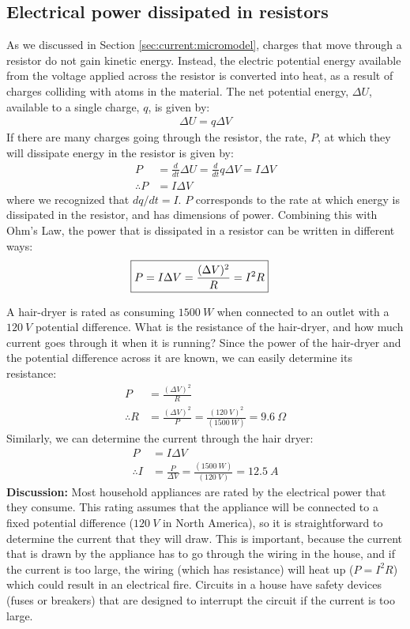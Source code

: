 \subsection{Electrical power dissipated in resistors}
As we discussed in Section \ref{sec:current:micromodel}, charges that move through a resistor do not gain kinetic energy. Instead, the electric potential energy available from the voltage applied across the resistor is converted into heat, as a result of charges colliding with atoms in the material. The net potential energy, $\Delta U$, available to a single charge, $q$, is given by:
\begin{align*}
\Delta U=q\Delta V
\end{align*}
If there are many charges going through the resistor, the rate, $P$, at which they will dissipate energy in the resistor is given by:
\begin{align*}
P&=\frac{d}{dt}\Delta U=\frac{d}{dt}q\Delta V=I\Delta V\\
\therefore P&=I\Delta V
\end{align*}
where we recognized that $dq/dt=I$. $P$ corresponds to the rate at which energy is dissipated in the resistor, and has dimensions of power. Combining this with Ohm's Law, the power that is dissipated in a resistor can be written in different ways:
\begin{align*}
\Aboxed{P=I \Delta V=\frac{(\Delta V)^2}{R}=I^2R}
\end{align*}
\begin{example}{A hair-dryer is rated as consuming $\SI{1500}{W}$ when connected to an outlet with a $\SI{120}{V}$ potential difference. What is the resistance of the hair-dryer, and how much current goes through it when it is running?}
Since the power of the hair-dryer and the potential difference across it are known, we can easily determine its resistance:
\begin{align*}
P&=\frac{(\Delta V)^2}{R}\\
\therefore R&=\frac{(\Delta V)^2}{P}=\frac{(\SI{120}{V})^2}{(\SI{1500}{W})}=\SI{9.6}{\Omega}
\end{align*}
Similarly, we can determine the current through the hair dryer:
\begin{align*}
P&=I\Delta V\\
\therefore I &=\frac{P}{\Delta V}=\frac{(\SI{1500}{W})}{(\SI{120}{V})}=\SI{12.5}{A}
\end{align*}
\textbf{Discussion: }Most household appliances are rated by the electrical power that they consume. This rating assumes that the appliance will be connected to a fixed potential difference ($\SI{120}{V}$ in North America), so it is  straightforward to determine the current that they will draw. This is important, because the current that is drawn by the appliance has to go through the wiring in the house, and if the current is too large, the wiring (which has resistance) will heat up ($P=I^2R$) which could result in an electrical fire. Circuits in a house have safety devices (fuses or breakers) that are designed to interrupt the circuit if the current is too large. 
\end{example}

